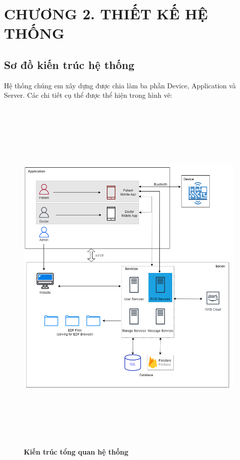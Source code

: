 
\section*{CHƯƠNG 2. THIẾT KẾ HỆ THỐNG}
\setcounter{section}{2}
\setcounter{subsection}{0} %
\setcounter{table}{0} %
\setcounter{figure}{0} %


\subsection{Sơ đồ kiến trúc hệ thống}
Hệ thống chúng em xây dựng được chia làm ba phần Device, Application và Server. Các chi tiết cụ thể được thể hiện trong
hình vẽ:

\begin{figure}[H]
  \centering
  \includegraphics[width=16cm,height=18cm]{Images/system/fmECG_architecture-System Architecture.drawio.png}
  \caption[Kiến trúc tổng quan hệ thống]{\bfseries \fontsize{12pt}{0pt}\selectfont Kiến trúc tổng quan hệ thống}
  \label{fmECG_architecture-System} %
\end{figure}

